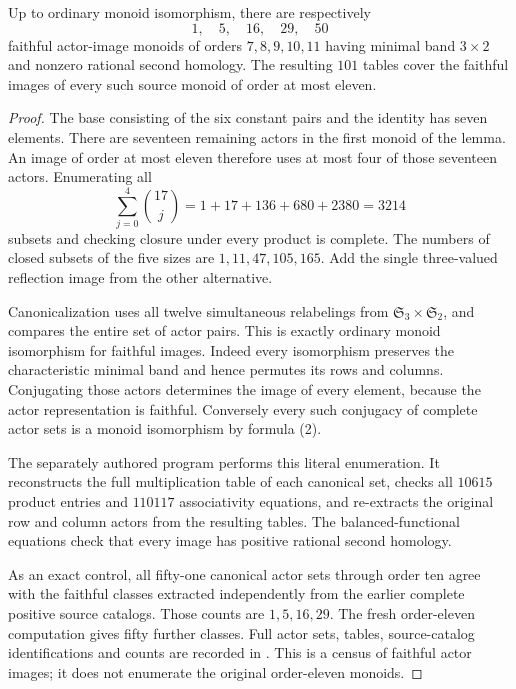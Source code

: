 \begin{proposition}
\label{CP2:A-three-by-two-faithful-hulls-through11}
Up to ordinary monoid isomorphism, there are respectively
\[
                  1,\quad5,\quad16,\quad29,\quad50
\]
faithful actor-image monoids of orders $7,8,9,10,11$
having minimal band $3\times2$ and nonzero rational
second homology.  The resulting $101$ tables cover
the faithful images of every such source monoid of order
at most eleven.
\end{proposition}
\begin{proof}
The base consisting of the six constant pairs and the
identity has seven elements.  There are seventeen
remaining actors in the first monoid of the lemma.
An image of order at most eleven therefore uses at most
four of those seventeen actors.  Enumerating all
\[
       \sum_{j=0}^{4}\binom{17}{j}
             =1+17+136+680+2380=3214
\]
subsets and checking closure under every product is
complete.  The numbers of closed subsets of the five
sizes are $1,11,47,105,165$.  Add the single
three-valued reflection image from the other alternative.

Canonicalization uses all twelve simultaneous relabelings
from $\mathfrak S_3\times\mathfrak S_2$, and compares the
entire set of actor pairs.  This is exactly ordinary
monoid isomorphism for faithful images.  Indeed every
isomorphism preserves the characteristic minimal band
and hence permutes its rows and columns.  Conjugating
those actors determines the image of every element,
because the actor representation is faithful.
Conversely every such conjugacy of complete actor sets
is a monoid isomorphism by formula (2).

The separately authored program
performs this literal enumeration.  It reconstructs the
full multiplication table of each canonical set, checks
all $10615$ product entries and $110117$ associativity
equations, and re-extracts the original row and column
actors from the resulting tables.  The balanced-functional
equations check that every image has positive rational
second homology.

As an exact control, all fifty-one canonical actor sets
through order ten agree with the faithful classes extracted
independently from the earlier complete positive source
catalogs.  Those counts are $1,5,16,29$.
The fresh order-eleven computation gives fifty further
classes.  Full actor sets, tables, source-catalog
identifications and counts are recorded in
.
This is a census of faithful actor images; it does not
enumerate the original order-eleven monoids.
\end{proof}

